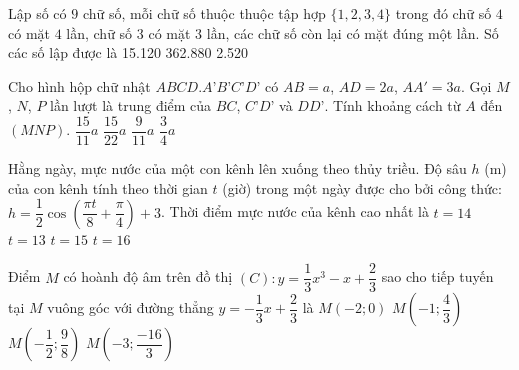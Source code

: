 \begin{ex}%
{}
\end{ex}
\begin{ex}%
	Lập số có $9$ chữ số, mỗi chữ số thuộc thuộc tập hợp $\lbrace1,2,3,4\rbrace$ trong đó chữ số $4$ có mặt $4$ lần, chữ số $3$ có mặt $3$ lần, các chữ số còn lại có mặt đúng một lần. Số các số lập được là
	\choice
	{}
	{15.120}
	{362.880}
	{2.520}
\end{ex}
\begin{ex}%
	Cho hình hộp chữ nhật $ABCD.A’B’C’D’$ có $AB=a$, $AD=2a$, $AA'=3a$. Gọi $M$, $N$, $P$ lần lượt là trung điểm của $BC$, $C’D’$ và $DD’$. Tính khoảng cách từ $A$ đến $(MNP)$.
	\choice
	{\True $ \dfrac{15}{11}a $}
	{$\dfrac{15}{22}a$}
	{$\dfrac{9}{11}a$}
	{$\dfrac{3}{4}a$}
\end{ex}
\begin{ex}%
	Hằng ngày, mực nước của một con kênh lên xuống theo thủy triều. Độ sâu $h$ (m) của con kênh tính theo thời gian $t$ (giờ) trong một ngày được cho bởi công thức: $h=\dfrac{1}{2}\cos \left(\dfrac{{\pi t}}{8}+ \dfrac{\pi}{4}\right)+3$. Thời điểm mực nước của kênh cao nhất là
	\choice
	{\True $ t = 14 $}
	{$ t = 13 $}
	{$ t = 15 $}
	{$ t = 16 $}
	\end{ex}
	\begin{ex}%
		Điểm $M$ có hoành độ âm trên đồ thị $(C):y=\dfrac{1}{3}{x^3}-x+\dfrac{2}{3}$ sao cho tiếp tuyến tại $M$ vuông góc với đường thẳng $y=-\dfrac{1}{3}x +\dfrac{2}{3}$ là
		\choice
		{$ M({- 2;0})$}
		{$ M\left(- 1;\dfrac{4}{3}\right)$}
		{\True $ M\left(- \dfrac{1}{2};\dfrac{9}{8}\right)$}
		{$ M\left(- 3;\dfrac{-16}{3}\right)$}
	\end{ex}

